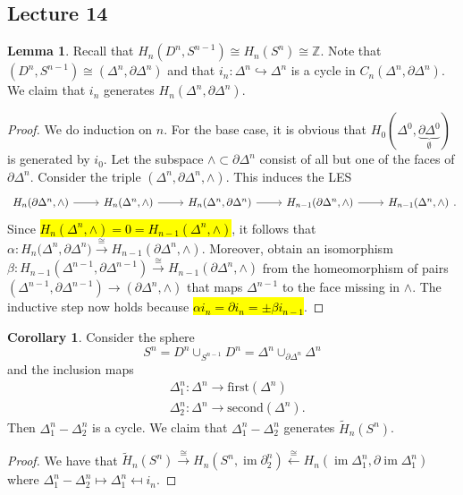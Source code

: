\documentclass[10pt,letterpaper,cm]{nupset}
\theoremstyle{definition}
\theoremstyle{theorem}
\newtheorem{lemma}[definition]{Lemma}
\newtheorem{corollary}[definition]{Corollary}
\theoremstyle{remark}
\newcommand{\Z}{\mathbb Z}
\newcommand{\1}{\mathbb{1}}
\newcommand{\0}{\vec 0}
\DeclareMathOperator{\im}{im}
\begin{document}
\subsection{Lecture 14}

\begin{lemma}
Recall that $H_n(D^n, S^{n-1}) \cong H_n(S^n) \cong \Z$. Note that $(D^n, S^{n-1}) \cong (\Delta^n, \partial{\Delta^n})$ and that $i_n : \Delta^n \hookrightarrow \Delta^n$ is a cycle in $C_n(\Delta^n, \partial{\Delta^n})$. We claim that $i_n$ generates $H_n(\Delta^n, \partial{\Delta^n})$.
\end{lemma}
\begin{proof}
We do induction on $n$. For the base case, it is obvious that $H_0(\Delta^0, \underbrace{\partial{\Delta^0}}_{\emptyset})$ is generated by $i_0$. Let the subspace $\wedge \subset \partial{\Delta^n}$ consist of all but one of the faces of $\partial{\Delta^n}$. Consider the triple $(\Delta^n, \partial{\Delta^n}, \wedge)$. This induces the LES
\[
\begin{tikzcd}
{H_n(\partial{\Delta^n, \wedge})} \arrow[r] & {H_n(\Delta^n, \wedge)} \arrow[r] & {H_n(\Delta^n, \partial{\Delta^n)}} \arrow[r] & {H_{n-1}(\partial{\Delta^n}, \wedge)} \arrow[r] & {H_{n-1}(\Delta^n, \wedge)}
\end{tikzcd}
.\] Since \hl{$H_n(\Delta^n, \wedge) =0 = H_{n-1}(\Delta^n, \wedge)$}, it follows that $\alpha: H_n(\Delta^n, \partial{\Delta^n)} \overset{\cong}{\longrightarrow}  H_{n-1}(\partial{\Delta^n}, \wedge)$. Moreover, obtain an isomorphism $\beta: H_{n-1}(\Delta^{n-1}, \partial{\Delta^{n-1}}) \overset{\cong}{\longrightarrow} H_{n-1}(\partial{\Delta^n}, \wedge)$ from the homeomorphism of pairs $(\Delta^{n-1}, \partial{\Delta^{n-1}}) \to (\partial{\Delta^n}, \wedge)$ that maps $\Delta^{n-1}$ to the face missing in $\wedge$. The inductive step now holds because \hl{$\alpha{i_n} = \partial{i_n}= \pm \beta{i_{n-1}}$}.
\end{proof}

\begin{corollary}
Consider the sphere $$S^n = D^n \cup_{S^{n-1}} D^n= \Delta^n \cup_{\partial{\Delta^n}}\Delta^n$$ and the inclusion maps 
\begin{align*}
& \Delta^n_1 :\Delta^n \to \text{first}(\Delta^n)
\\ &  \Delta^n_2 :\Delta^n \to \text{second}(\Delta^n).
\end{align*} Then $\Delta^n_1 - \Delta^n_2$ is a cycle. We claim that $\Delta_1^n -\Delta_2^n$ generates $\widetilde{H}_n(S^n)$.
\end{corollary}
\begin{proof}
We have that $\widetilde{H}_n(S^n) \overset{\cong}{\longrightarrow} H_n(S^n, \im{\partial_2^n}) \overset{\cong}{\longleftarrow} H_n(\im{\Delta^n_1}, \partial{\im{\Delta_1^n}})$ where $\Delta_1^n -\Delta_2^n \mapsto \Delta^n_1 \mapsfrom i_n$.
\end{proof}
\end{document}
